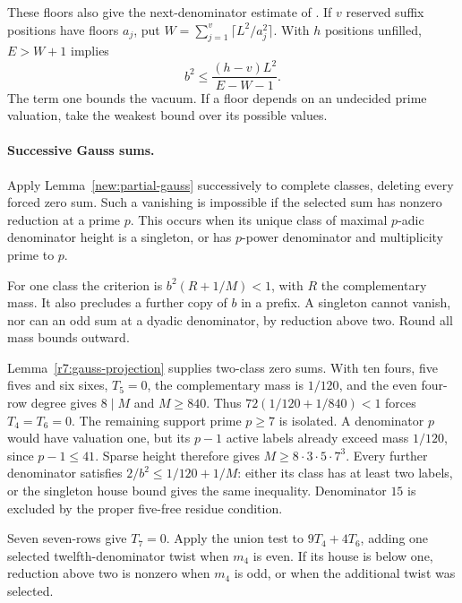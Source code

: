 \documentclass[11pt]{amsart}
\numberwithin{equation}{section}
\theoremstyle{definition}
\theoremstyle{plain}
\begin{document}
These floors also give the next-denominator estimate of
\cite[\S21.4, following Lemma~21.6]{BDPcore}. If $v$
reserved suffix positions have floors $a_j$, put
$W=\sum_{j=1}^v\lceil L^2/a_j^2\rceil$. With $h$ positions
unfilled, $E>W+1$ implies
\[
                 b^2\le\frac{(h-v)L^2}{E-W-1}.
\]
The term one bounds the vacuum. If a floor depends on an undecided
prime valuation, take the weakest bound over its possible values.

\paragraph{Successive Gauss sums.}
Apply Lemma~\ref{new:partial-gauss} successively to complete
classes, deleting every forced zero sum. Such a vanishing is
impossible if the selected sum has nonzero reduction at a prime $p$.
This occurs when its unique class of maximal $p$-adic denominator
height is a singleton, or has $p$-power denominator and multiplicity
prime to $p$.

For one class the criterion is $b^2(R+1/M)<1$, with $R$ the
complementary mass. It also precludes a further copy of $b$ in a
prefix. A singleton cannot vanish, nor can an odd sum at a dyadic
denominator, by reduction above two. Round all mass bounds outward.

Lemma~\ref{r7:gauss-projection} supplies two-class zero sums.
With ten fours, five fives and six
sixes, $T_5=0$, the complementary mass is $1/120$, and the even
four-row degree gives $8\mid M$ and $M\ge840$. Thus
$72(1/120+1/840)<1$ forces $T_4=T_6=0$.
The remaining support prime $p\ge7$ is isolated. A denominator
$p$ would have valuation one, but its $p-1$ active labels already
exceed mass $1/120$, since $p-1\le41$. Sparse height therefore gives
$M\ge8\cdot3\cdot5\cdot7^3$. Every further denominator satisfies
$2/b^2\le1/120+1/M$: either its class has at least two labels,
or the singleton house bound gives the same inequality. Denominator
$15$ is excluded by the proper five-free residue condition.

Seven seven-rows give $T_7=0$. Apply the union test to
$9T_4+4T_6$, adding one selected twelfth-denominator twist when
$m_4$ is even. If its house is below one, reduction above two is
nonzero when $m_4$ is odd, or when the additional twist was selected.
\end{document}
